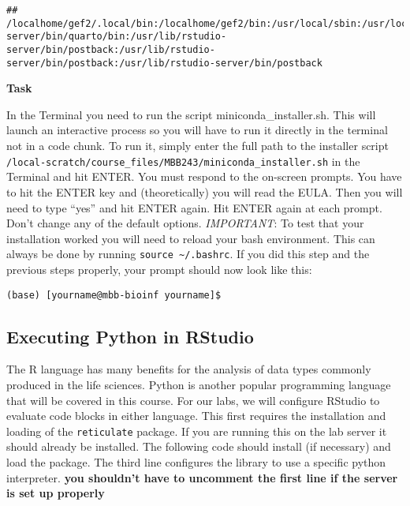 \documentclass[
]{article}
\newenvironment{Shaded}{\begin{snugshade}}{\end{snugshade}}
\newcommand{\BuiltInTok}[1]{#1}
\newcommand{\VariableTok}[1]{\textcolor[rgb]{0.00,0.00,0.00}{#1}}
\begin{document}
\begin{Shaded}
\end{Shaded}

\begin{verbatim}
## /localhome/gef2/.local/bin:/localhome/gef2/bin:/usr/local/sbin:/usr/local/bin:/usr/sbin:/usr/bin:/usr/lib/rstudio-server/bin/quarto/bin:/usr/lib/rstudio-server/bin/postback:/usr/lib/rstudio-server/bin/postback:/usr/lib/rstudio-server/bin/postback
\end{verbatim}

\textbf{Task}

In the Terminal you need to run the script miniconda\_installer.sh. This
will launch an interactive process so you will have to run it directly
in the terminal not in a code chunk. To run it, simply enter the full
path to the installer script
\texttt{/local-scratch/course\_files/MBB243/miniconda\_installer.sh} in
the Terminal and hit ENTER. You must respond to the on-screen prompts.
You have to hit the ENTER key and (theoretically) you will read the
EULA. Then you will need to type ``yes'' and hit ENTER again. Hit ENTER
again at each prompt. Don't change any of the default options.
\emph{IMPORTANT}: To test that your installation worked you will need to
reload your bash environment. This can always be done by running
\texttt{source\ \textasciitilde{}/.bashrc}. If you did this step and the
previous steps properly, your prompt should now look like this:

\texttt{(base)\ {[}yourname@mbb-bioinf\ yourname{]}\$}

\hypertarget{executing-python-in-rstudio}{%
\subsection{Executing Python in
RStudio}\label{executing-python-in-rstudio}}

The R language has many benefits for the analysis of data types commonly
produced in the life sciences. Python is another popular programming
language that will be covered in this course. For our labs, we will
configure RStudio to evaluate code blocks in either language. This first
requires the installation and loading of the \texttt{reticulate}
package. If you are running this on the lab server it should already be
installed. The following code should install (if necessary) and load the
package. The third line configures the library to use a specific python
interpreter. \textbf{you shouldn't have to uncomment the first line if
the server is set up properly}
\end{document}
